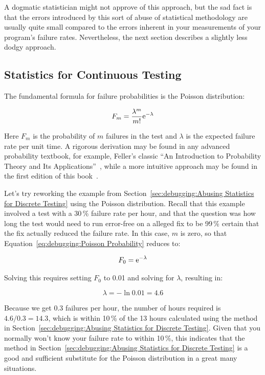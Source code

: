 A dogmatic statistician might not approve of this approach, but the
sad fact is that the errors introduced by this sort of abuse of
statistical methodology are usually quite small compared to the
errors inherent in your measurements of your program's failure rates.
Nevertheless, the next section describes a slightly less dodgy approach.

\subsection{Statistics for Continuous Testing}
\label{sec:debuggingStatistics for Continuous Testing}

The fundamental formula for failure probabilities is the Poisson
distribution:

\begin{equation}
	F_m = \frac{\lambda^m}{m!} \mathrm{e}^{-\lambda}
\label{eq:debugging:Poisson Probability}
\end{equation}

Here $F_m$ is the probability of $m$ failures in the test and
$\lambda$ is the expected failure rate per unit time.
A rigorous derivation may be found in any advanced probability
textbook, for example, Feller's classic ``An Introduction to Probability
Theory and Its Applications''~\cite{Feller58}, while a more
intuitive approach may be found in the first edition of
this book~\cite{McKenney2014ParallelProgramming-e1}.

Let's try reworking the example from
Section~\ref{sec:debugging:Abusing Statistics for Discrete Testing}
using the Poisson distribution.
Recall that this example involved a test with a 30\,\% failure rate per
hour, and that the question was how long the test would need to run
error-free
on a alleged fix to be 99\,\% certain that the fix actually reduced the
failure rate.
In this case, $m$ is zero, so that
Equation~\ref{eq:debugging:Poisson Probability} reduces to:

\begin{equation}
	F_0 =  \mathrm{e}^{-\lambda}
\end{equation}

Solving this requires setting $F_0$
to 0.01 and solving for $\lambda$, resulting in:

\begin{equation}
	\lambda = - \ln 0.01 = 4.6
\end{equation}

Because we get $0.3$ failures per hour, the number of hours required
is $4.6/0.3 = 14.3$, which is within 10\,\% of the 13 hours
calculated using the method in
Section~\ref{sec:debugging:Abusing Statistics for Discrete Testing}.
Given that you normally won't know your failure rate to within 10\,\%,
this indicates that the method in
Section~\ref{sec:debugging:Abusing Statistics for Discrete Testing}
is a good and sufficient substitute for the Poisson distribution in
a great many situations.

